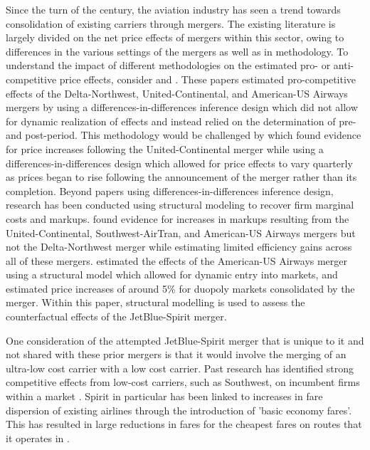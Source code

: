 \documentclass{article}
\begin{document}
	Since the turn of the century, the aviation industry has seen a trend towards consolidation of existing carriers through mergers. The existing literature is largely divided on the net price effects of mergers within this sector, owing to differences in the various settings of the mergers as well as in methodology. To understand the impact of different methodologies on the estimated pro- or anti-competitive price effects, consider \citet{luo_price_2014} and \citet{carlton_are_2019}. These papers estimated pro-competitive effects of the Delta-Northwest, United-Continental, and American-US Airways mergers by using a differences-in-differences inference design which did not allow for dynamic realization of effects and instead relied on the determination of pre- and post-period. This methodology would be challenged by \citet{fan_when_2020} which found evidence for price increases following the United-Continental merger while using a differences-in-differences design which allowed for price effects to vary quarterly as prices began to rise following the announcement of the merger rather than its completion. Beyond papers using differences-in-differences inference design, research has been conducted using structural modeling to recover firm marginal costs and markups. \citet{bet_retrospective_2021} found evidence for increases in markups resulting from the United-Continental, Southwest-AirTran, and American-US Airways mergers but not the Delta-Northwest merger while estimating limited efficiency gains across all of these mergers. \citet{ciliberto_market_2021} estimated the effects of the American-US Airways merger using a structural model which allowed for dynamic entry into markets, and estimated price increases of around 5\% for duopoly markets consolidated by the merger. Within this paper, structural modelling is used to assess the counterfactual effects of the JetBlue-Spirit merger. 

    One consideration of the attempted JetBlue-Spirit merger that is unique to it and not shared with these prior mergers is that it would involve the merging of an ultra-low cost carrier with a low cost carrier. Past research has identified strong competitive effects from low-cost carriers, such as Southwest, on incumbent firms within a market \citep{morrison_actual_2001, goolsbee_how_2008}. Spirit in particular has been linked to increases in fare dispersion of existing airlines through the introduction of 'basic economy fares'. This has resulted in large reductions in fares for the cheapest fares on routes that it operates in \citep{shrago_spirit_2024}.
    
\end{document}
